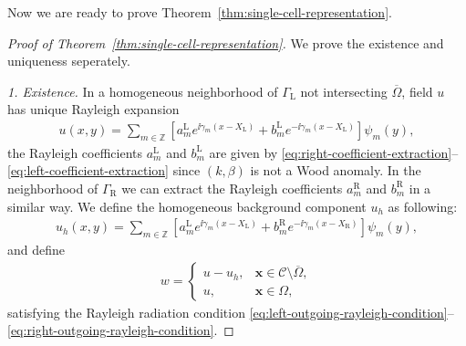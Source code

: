 Now we are ready to prove Theorem~\ref{thm:single-cell-representation}.
\begin{proof}[Proof of Theorem~\ref{thm:single-cell-representation}]
We prove the existence and uniqueness seperately.

\emph{1. Existence.}
In a homogeneous neighborhood of $\Gamma_\mathrm{L}$ not intersecting $\overline{\Omega}$,
field $u$ has unique Rayleigh expansion \begin{align*}
  u(x, y) = \sum_{m \in \mathbb{Z}} \left[ a_m^\mathrm{L}e^{\ii\gamma_m (x - X_\mathrm{L})} + b_m^\mathrm{L}e^{-\ii\gamma_m (x - X_\mathrm{L})} \right] \psi_m(y), 
\end{align*}
the Rayleigh coefficients $a_m^\mathrm{L}$ and $b_m^\mathrm{L}$ are given by \eqref{eq:right-coefficient-extraction}--\eqref{eq:left-coefficient-extraction} since $(k, \beta)$ is not a Wood anomaly.
In the neighborhood of $\Gamma_\mathrm{R}$ we can extract the Rayleigh coefficients $a_m^\mathrm{R}$ and $b_m^\mathrm{R}$ in a similar way. We define the homogeneous 
background component $u_h$ as following:
\begin{align}
  u_h(x, y) = \sum_{m \in \mathbb{Z}} \left[ a_m^\mathrm{L}e^{\ii\gamma_m (x - X_\mathrm{L})} + b_m^\mathrm{R}e^{-\ii\gamma_m (x - X_\mathrm{R})} \right] \psi_m(y),
\end{align}
and define \begin{align}
  w = \begin{cases}
    u - u_h, & \mathbf{x} \in \mathcal{C}\setminus\overline{\Omega},\\
    u, & \mathbf{x} \in \Omega,
  \end{cases}
\end{align}
satisfying the Rayleigh radiation condition \eqref{eq:left-outgoing-rayleigh-condition}--\eqref{eq:right-outgoing-rayleigh-condition}. 



\end{proof}
